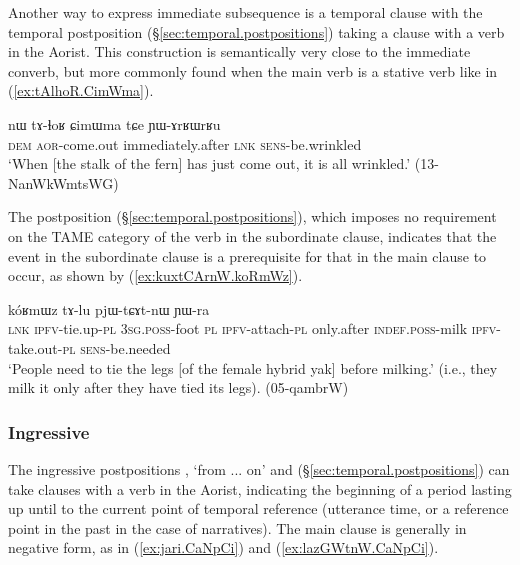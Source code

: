 Another way to express immediate subsequence is a temporal clause with the temporal postposition  (§\ref{sec:temporal.postpositions}) taking a clause with a verb in the Aorist. This construction is semantically very close to the immediate converb, but more commonly found when the main verb is a stative verb like  in (\ref{ex:tAlhoR.CimWma}).
 
\begin{exe}
\ex \label{ex:tAlhoR.CimWma} 
\gll  nɯ tɤ-ɬoʁ ɕimɯma tɕe ɲɯ-ɤrʁɯrʁu \\
\textsc{dem} \textsc{aor}-come.out immediately.after \textsc{lnk} \textsc{sens}-be.wrinkled \\
\glt  `When [the stalk of the fern] has just come out, it is all wrinkled.' (13-NanWkWmtsWG)
 \end{exe}  
 
 The postposition   (§\ref{sec:temporal.postpositions}), which imposes no requirement on the TAME category of the verb in the subordinate clause, indicates that the event in the subordinate clause is a prerequisite for that in the main clause to occur, as shown by (\ref{ex:kuxtCArnW.koRmWz}).
 
 \begin{exe}
\ex \label{ex:kuxtCArnW.koRmWz} 
\gll   [ɯ-mi ra ku-xtɕɤr-nɯ] kóʁmɯz tɤ-lu pjɯ-tɕɤt-nɯ ɲɯ-ra \\
 \textsc{lnk} \textsc{ipfv}-tie.up-\textsc{pl} \textsc{3sg}.\textsc{poss}-foot \textsc{pl} \textsc{ipfv}-attach-\textsc{pl} only.after \textsc{indef}.\textsc{poss}-milk \textsc{ipfv}-take.out-\textsc{pl}  \textsc{sens}-be.needed \\
\glt  `People need to tie the legs [of the female hybrid yak] before milking.' (i.e., they milk it only after they have tied its legs).   (05-qambrW)
  \end{exe}  
 
 
\subsubsection{Ingressive} \label{sec:since.clause} 
 The ingressive postpositions  , `from ... on' and  (§\ref{sec:temporal.postpositions}) can take clauses with a verb in the Aorist, indicating the beginning of a period lasting up until to the current point of temporal reference (utterance time, or a reference point in the past in the case of narratives). The main clause is generally in negative form, as in (\ref{ex:jari.CaNpCi}) and (\ref{ex:lazGWtnW.CaNpCi}).

